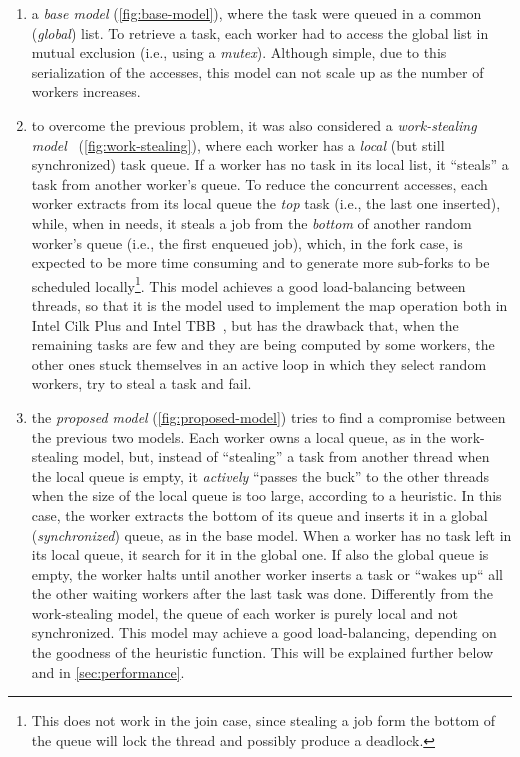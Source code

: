 \documentclass[11pt, a4paper]{article}
\begin{document}
\begin{enumerate}
	\item a \emph{base model} (\autoref{fig:base-model}), where the task were queued in a common (\emph{global}) list. To retrieve a task, each worker had to access the global list in mutual exclusion (i.e., using a \emph{mutex}). Although simple, due to this serialization of the accesses, this model can not scale up as the number of workers increases.
	
	\item to overcome the previous problem, it was also considered a \emph{work-stealing model}~\cite{mccool2012structured} (\autoref{fig:work-stealing}), where each worker has a \emph{local} (but still synchronized) task queue. If a worker has no task in its local list, it ``steals'' a task from another worker's queue. To reduce the concurrent accesses, each worker extracts from its local queue the \emph{top} task (i.e., the last one inserted), while, when in needs, it steals a job from the \emph{bottom} of another random worker's queue (i.e., the first enqueued job), which, in the fork case, is expected to be more time consuming and to generate more sub-forks to be scheduled locally\footnote{This does not work in the join case, since stealing a job form the bottom of the queue will lock the thread and possibly produce a deadlock.}. This model achieves a good load-balancing between threads, so that it is the model used to implement the map operation both in Intel Cilk Plus and Intel TBB~\cite{mccool2012structured}, but has the drawback that, when the remaining tasks are few and they are being computed by some workers, the other ones stuck themselves in an active loop in which they select random workers, try to steal a task and fail.
	
	\item the \emph{proposed model} (\autoref{fig:proposed-model}) tries to find a compromise between the previous two models. Each worker owns a local queue, as in the work-stealing model, but, instead of ``stealing'' a task from another thread when the local queue is empty, it \emph{actively} ``passes the buck'' to the other threads when the size of the local queue is too large, according to a heuristic. In this case, the worker extracts the bottom of its queue and inserts it in a global (\emph{synchronized}) queue, as in the base model. When a worker has no task left in its local queue, it search for it in the global one. If also the global queue is empty, the worker halts until another worker inserts a task or ``wakes up`` all the other waiting workers after the last task was done. Differently from the work-stealing model, the queue of each worker is purely local and not synchronized. This model may achieve a good load-balancing, depending on the goodness of the heuristic function. This will be explained further below and in \autoref{sec:performance}.
\end{enumerate}
\end{document}
